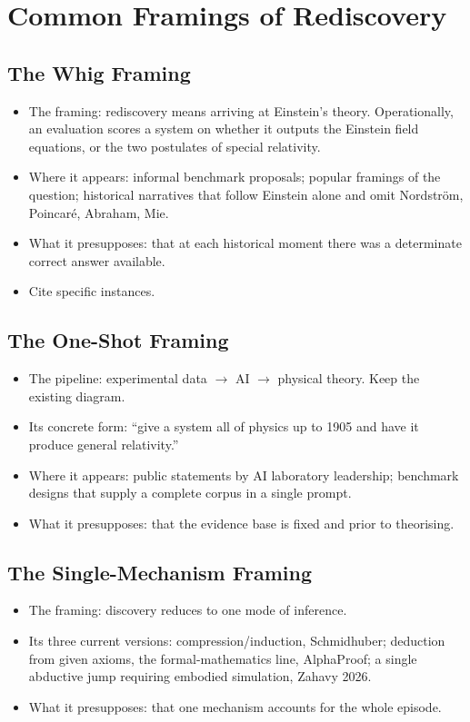 \documentclass{article}
\begin{document}
\section{Common Framings of Rediscovery}
\label{sec:common-framings}

\subsection{The Whig Framing}
\begin{itemize}
  \item The framing: rediscovery means arriving at Einstein's theory. Operationally, an evaluation scores a system on whether it outputs the Einstein field equations, or the two postulates of special relativity.
  \item Where it appears: informal benchmark proposals; popular framings of the question; historical narratives that follow Einstein alone and omit Nordström, Poincaré, Abraham, Mie.
  \item What it presupposes: that at each historical moment there was a determinate correct answer available.
  \item Cite specific instances.
\end{itemize}

\subsection{The One-Shot Framing}
\begin{itemize}
  \item The pipeline: experimental data $\rightarrow$ AI $\rightarrow$ physical theory. Keep the existing diagram.
  \item Its concrete form: ``give a system all of physics up to 1905 and have it produce general relativity.''
  \item Where it appears: public statements by AI laboratory leadership; benchmark designs that supply a complete corpus in a single prompt.
  \item What it presupposes: that the evidence base is fixed and prior to theorising.
\end{itemize}

\subsection{The Single-Mechanism Framing}
\begin{itemize}
  \item The framing: discovery reduces to one mode of inference.
  \item Its three current versions: compression/induction, Schmidhuber; deduction from given axioms, the formal-mathematics line, AlphaProof; a single abductive jump requiring embodied simulation, Zahavy 2026.
  \item What it presupposes: that one mechanism accounts for the whole episode.
\end{itemize}
\end{document}
